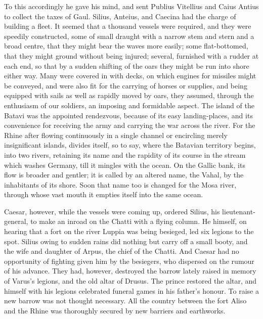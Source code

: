 To this accordingly he gave his mind, and sent Publius Vitellius and Caius Antius to collect the taxes of Gaul. Silius, Anteius, and Caecina had the charge of building a fleet. It seemed that a thousand vessels were required, and they were speedily constructed, some of small draught with a narrow stem and stern and a broad centre, that they might bear the waves more easily; some flat-bottomed, that they might ground without being injured; several, furnished with a rudder at each end, so that by a sudden shifting of the oars they might be run into shore either way. Many were covered in with decks, on which engines for missiles might be conveyed, and were also fit for the carrying of horses or supplies, and being equipped with sails as well as rapidly moved by oars, they assumed, through the enthusiasm of our soldiers, an imposing and formidable aspect. The island of the Batavi was the appointed rendezvous, because of its easy landing-places, and its convenience for receiving the army and carrying the war across the river. For the Rhine after flowing continuously in a single channel or encircling merely insignificant islands, divides itself, so to say, where the Batavian territory begins, into two rivers, retaining its name and the rapidity of its course in the stream which washes Germany, till it mingles with the ocean. On the Gallic bank, its flow is broader and gentler; it is called by an altered name, the Vahal, by the inhabitants of its shore. Soon that name too is changed for the Mosa river, through whose vast mouth it empties itself into the same ocean.


Caesar, however, while the vessels were coming up, ordered Silius, his lieutenant-general, to make an inroad on the Chatti with a flying column. He himself, on hearing that a fort on the river Luppia was being besieged, led six legions to the spot. Silius owing to sudden rains did nothing but carry off a small booty, and the wife and daughter of Arpus, the chief of the Chatti. And Caesar had no opportunity of fighting given him by the besiegers, who dispersed on the rumour of his advance. They had, however, destroyed the barrow lately raised in memory of Varus's legions, and the old altar of Drusus. The prince restored the altar, and himself with his legions celebrated funeral games in his father's honour. To raise a new barrow was not thought necessary. All the country between the fort Aliso and the Rhine was thoroughly secured by new barriers and earthworks.


